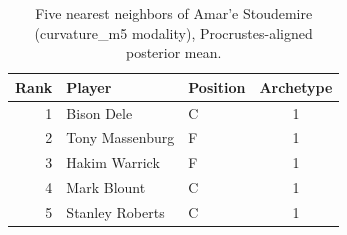 \begin{table}[htbp]
  \centering\small
  \begin{tabular}{rllc}
    \toprule
    Rank & Player & Position & Archetype \\
    \midrule
    1 & Bison Dele & C & 1 \\
    2 & Tony Massenburg & F & 1 \\
    3 & Hakim Warrick & F & 1 \\
    4 & Mark Blount & C & 1 \\
    5 & Stanley Roberts & C & 1 \\
    \bottomrule
  \end{tabular}
  \caption{Five nearest neighbors of Amar'e Stoudemire (curvature_m5 modality), Procrustes-aligned posterior mean.}
  \label{tab:Amar_e_Stoudemire_neighbors_curvature_m5}
\end{table}

